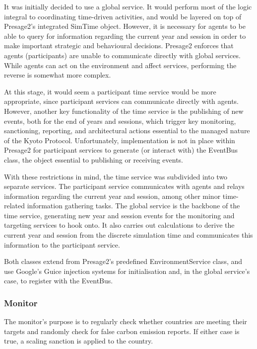 It was initially decided to use a global service. It would perform most of the logic integral to coordinating time-driven activities, and would be layered on top of Presage2's integrated SimTime object. However, it is necessary for agents to be able to query for information regarding the current year and session in order to make important strategic and behavioural decisions. Presage2 enforces that agents (participants) are unable to communicate directly with global services. While agents can act on the environment and affect services, performing the reverse is somewhat more complex.

At this stage, it would seem a participant time service would be more appropriate, since participant services can communicate directly with agents. However, another key functionality of the time service is the publishing of new events, both for the end of years and sessions, which trigger key monitoring, sanctioning, reporting, and architectural actions essential to the managed nature of the Kyoto Protocol. Unfortunately, implementation is not in place within Presage2 for participant services to generate (or interact with) the EventBus class, the object essential to publishing or receiving events.

With these restrictions in mind, the time service was subdivided into two separate services. The participant service communicates with agents and relays information regarding the current year and session, among other minor time-related information gathering tasks. The global service is the backbone of the time service, generating new year and session events for the monitoring and targeting services to hook onto. It also carries out calculations to derive the current year and session from the discrete simulation time and communicates this information to the participant service.

Both classes extend from Presage2's predefined EnvironmentService class, and use Google's Guice injection systems for initialisation and, in the global service's case, to register with the EventBus.

\subsubsection{Monitor}

The monitor's purpose is to regularly check whether countries are meeting their targets and randomly check for false carbon emission reports. If either case is true, a scaling sanction is applied to the country.

